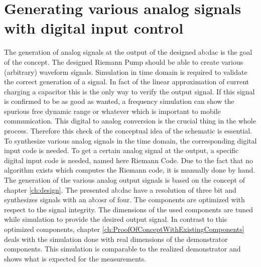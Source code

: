 \section{Generating various analog signals with digital input control}
The generation of analog signals at the output of the designed \gls{ab:dac} is the goal of the concept. The designed Riemann Pump should be able to create various (arbitrary) waveform signals.
Simulation in time domain is required to validate the correct generation of a signal. In fact of the linear approximation of current charging a capacitor this is the only way to verify the output signal. If this signal is confirmed to be as good as wanted, a frequency simulation can show the spurious free dynamic range or whatever which is important to mobile communication.
This digital to analog conversion is the crucial thing in the whole process.
Therefore this check of the conceptual idea of the schematic is essential.\\
To synthesize various analog signals in the time domain, the corresponding digital input code is needed. 
To get a certain analog signal at the output, a specific digital input code is needed, named here Riemann Code.
Due to the fact that no algorithm exists which computes the Riemann code, it is manually done by hand.\\ 
 The generation of the various analog output signals is based on the concept of chapter \ref{ch:design}. 
 The presented \gls{ab:dac} have a resolution of three bit and synthesizes signals with an \gls{ab:osr} of four. 
  The components are optimized with respect to the signal integrity. The dimensions of the used components are tuned while simulation to provide the desired output signal.
  In contrast to this optimized components, chapter \ref{ch:ProofOfConceptWithExistingComponents} deals with the simulation done with real dimensions of the demonstrator components. 
  This simulation is comparable to the realized demonstrator and shows what is expected for the measurements.
 
